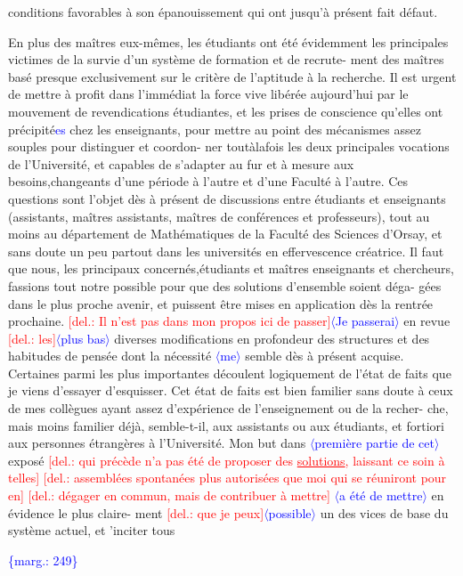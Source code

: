 \documentclass[11pt]{article}
\newcommand{\hand}[1]{\textcolor{blue}{#1}}
\let\over\relax
\newcommand{\over}[2]{\textcolor{gray}{#1}\textcolor{blue}{\ensuremath{^{\!\nearrow}}#2}}
\newcommand{\inserted}[2][]{\textcolor{blue}{$\langle$#2$\rangle$}}
\newcommand{\margin}[1]{\textcolor{blue}{\{\textsf{marg.:} #1\}}}
\newcommand{\deleted}[1]{\textcolor{red}{[\textsf{del.:} #1]}}
\newcommand{\uline}[1]{\underline{#1}}
\newcommand{\unsure}[1]{[#1?]}
\begin{document}
conditions favorables à son épanouissement qui ont jusqu'à présent fait
défaut.

En plus des maîtres eux-mêmes, les étudiants ont été évidemment les
principales victimes de la survie d'un système de formation et de recrute-%
ment des maîtres basé presque exclusivement sur le critère de l'aptitude
à la recherche. Il est urgent de mettre à profit dans l'immédiat la force
vive libérée aujourd'hui par le mouvement de revendications étudiantes, et
les prises de conscience qu'elles ont précipité\hand{es} chez les enseignants,
pour mettre au point des mécanismes assez souples pour distinguer et coordon-%
ner toutàlafois les deux principales vocations de l'Université, et capables
de s'adapter au fur et à mesure aux besoins,changeants d'une période à l'autre
et d'une Faculté à l'autre. Ces questions sont l'objet dès à présent de
discussions entre étudiants et enseignants (assistants, maîtres assistants,
maîtres de conférences et professeurs), tout au moins au département de
Mathématiques de la Faculté des Sciences d'Orsay, et sans doute un peu
partout dans les universités en effervescence créatrice. Il faut que nous,
les principaux concernés,étudiants et maîtres enseignants et chercheurs,
fassions tout notre possible pour que des solutions d'ensemble soient déga-%
gées dans le plus proche avenir, et puissent être mises en application dès
la rentrée prochaine. \deleted{Il n'est pas dans mon propos ici de passer}\inserted{Je passerai} en revue
\deleted{les}\inserted{plus bas} diverses modifications en profondeur des structures et des habitudes de
pensée dont la nécessité \inserted{me} semble dès à présent acquise. Certaines parmi les
plus importantes découlent logiquement de l'état de faits que je viens
d'essayer d'esquisser. Cet état de faits est bien familier sans doute à ceux
de mes collègues ayant assez d'expérience de l'enseignement ou de la recher-%
che, mais moins familier déjà, semble-t-il, aux assistants ou aux étudiants,
et \over{à}{\unsure{a}} fortiori aux personnes étrangères à l'Université. Mon but dans \over{l'}{la} \inserted{première partie de cet} exposé
\deleted{qui précède n'a pas été de proposer des \uline{solutions}, laissant ce soin à telles}
\deleted{assemblées spontanées plus autorisées que moi qui se réuniront pour en}
\deleted{dégager en commun, mais de contribuer à mettre} \inserted{a été de mettre} en évidence le plus claire-%
ment \deleted{que je peux}\inserted{possible} un des vices de base du système actuel, et \over{d}{\unsure{d|à}}'inciter tous

\margin{249}
\end{document}
